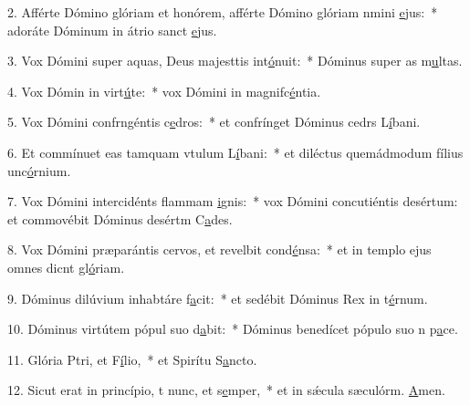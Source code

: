 2. Afférte Dómino glóriam et honórem, afférte Dómino glóriam nmini \uline{e}jus:~* adoráte Dóminum in átrio sanct \uline{e}jus.\par 
3. Vox Dómini super aquas, Deus majesttis int\uline{ó}nuit:~* Dóminus super as m\uline{u}ltas.\par 
4. Vox Dómin in virt\uline{ú}te:~* vox Dómini in magnifc\uline{é}ntia.\par 
5. Vox Dómini confrngéntis c\uline{e}dros:~* et confrínget Dóminus cedrs L\uline{í}bani.\par 
6. Et commínuet eas tamquam vtulum L\uline{í}bani:~* et diléctus quemádmodum fílius unc\uline{ó}rnium.\par 
7. Vox Dómini intercidénts flammam \uline{i}gnis:~* vox Dómini concutiéntis desértum: et commovébit Dóminus desértm C\uline{a}des.\par 
8. Vox Dómini præparántis cervos, et revelbit cond\uline{é}nsa:~* et in templo ejus omnes dicnt gl\uline{ó}riam.\par 
9. Dóminus dilúvium inhabtáre f\uline{a}cit:~* et sedébit Dóminus Rex in t\uline{é}rnum.\par 
10. Dóminus virtútem pópul suo d\uline{a}bit:~* Dóminus benedícet pópulo suo n p\uline{a}ce.\par 
11. Glória Ptri, et F\uline{í}lio,~* et Spirítu S\uline{a}ncto.\par 
12. Sicut erat in princípio, t nunc, et s\uline{e}mper,~* et in sǽcula sæculórm. \uline{A}men.\par 
